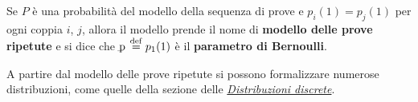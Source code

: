 \begin{multicols*}{2}
    \begin{definition}
        Se $P$ è una probabilità del modello della sequenza di prove e
        $p_i(1) = p_j(1)$ per ogni coppia $i$, $j$, allora il modello
        prende il nome di \textbf{modello delle prove ripetute} e si dice
        che $\pbern \defeq p_1(1)$ è il \textbf{parametro di Bernoulli}.
    \end{definition}

    A partire dal modello delle prove ripetute si possono formalizzare
    numerose distribuzioni, come quelle della sezione delle
    \textit{\hyperref[tab:distr_discrete]{Distribuzioni discrete}}.
\end{multicols*}